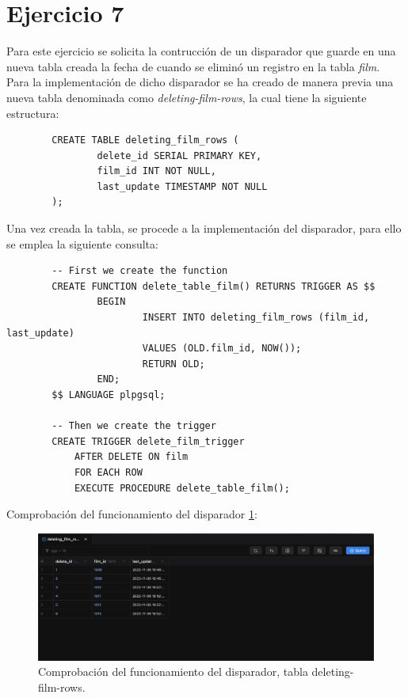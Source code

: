\documentclass{report}
\begin{document}
	\section{Ejercicio 7}
	Para este ejercicio se solicita la contrucción de un disparador que guarde en una nueva tabla creada la fecha de cuando se eliminó un registro en la tabla \emph{film}.\\

	Para la implementación de dicho disparador se ha creado de manera previa una nueva tabla denominada como \emph{deleting-film-rows}, la cual tiene la siguiente estructura:

	\begin{verbatim}
		CREATE TABLE deleting_film_rows (
				delete_id SERIAL PRIMARY KEY,
				film_id INT NOT NULL,
				last_update TIMESTAMP NOT NULL
		);
	\end{verbatim}

	Una vez creada la tabla, se procede a la implementación del disparador, para ello se emplea la siguiente consulta:

	\begin{verbatim}
		-- First we create the function
		CREATE FUNCTION delete_table_film() RETURNS TRIGGER AS $$
				BEGIN
						INSERT INTO deleting_film_rows (film_id, last_update)
						VALUES (OLD.film_id, NOW());
						RETURN OLD;
				END;
		$$ LANGUAGE plpgsql;

		-- Then we create the trigger
		CREATE TRIGGER delete_film_trigger
			AFTER DELETE ON film
			FOR EACH ROW
			EXECUTE PROCEDURE delete_table_film();
	\end{verbatim}

	Comprobación del funcionamiento del disparador \ref{fig:Exercice-7}:

	\begin{figure}[H]
		\centering
		\includegraphics[scale=0.5]{img/Exercice-7-Comprobation.png}
		\caption{Comprobación del funcionamiento del disparador, tabla deleting-film-rows.}
		\label{fig:Exercice-7}
	\end{figure}
\end{document}
